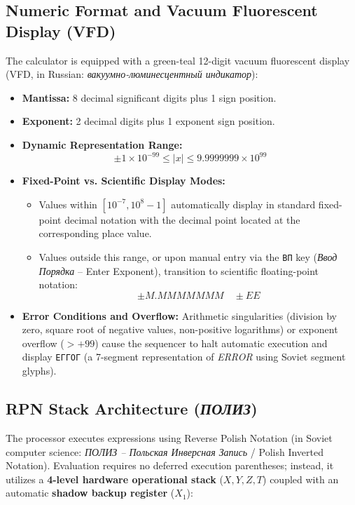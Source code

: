 \documentclass[11pt,a4paper]{article}
\begin{document}
\subsection{Numeric Format and Vacuum Fluorescent Display (VFD)}
The calculator is equipped with a green-teal 12-digit vacuum fluorescent display (VFD, in Russian: \textit{вакуумно-люминесцентный индикатор}):
\begin{itemize}
    \item \textbf{Mantissa:} 8 decimal significant digits plus 1 sign position.
    \item \textbf{Exponent:} 2 decimal digits plus 1 exponent sign position.
    \item \textbf{Dynamic Representation Range:}
    \[
    \pm 1 \times 10^{-99} \le |x| \le 9.9999999 \times 10^{99}
    \]
    \item \textbf{Fixed-Point vs. Scientific Display Modes:}
    \begin{itemize}
        \item Values within $[10^{-7}, 10^8 - 1]$ automatically display in standard fixed-point decimal notation with the decimal point located at the corresponding place value.
        \item Values outside this range, or upon manual entry via the \texttt{ВП} key (\textit{Ввод Порядка} -- Enter Exponent), transition to scientific floating-point notation:
        \[
        \pm M.MMMMMMM \quad \pm EE
        \]
    \end{itemize}
    \item \textbf{Error Conditions and Overflow:} Arithmetic singularities (division by zero, square root of negative values, non-positive logarithms) or exponent overflow ($> +99$) cause the sequencer to halt automatic execution and display \texttt{ЕГГОГ} (a 7-segment representation of \textit{ERROR} using Soviet segment glyphs).
\end{itemize}

\subsection{RPN Stack Architecture (\textit{ПОЛИЗ})}
The processor executes expressions using Reverse Polish Notation (in Soviet computer science: \textit{ПОЛИЗ -- Польская Инверсная Запись} / Polish Inverted Notation). Evaluation requires no deferred execution parentheses; instead, it utilizes a \textbf{4-level hardware operational stack} ($X, Y, Z, T$) coupled with an automatic \textbf{shadow backup register} ($X_1$):
\end{document}
